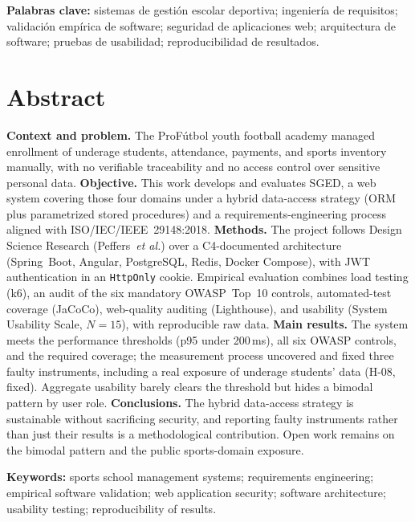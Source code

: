 \documentclass[11pt,a4paper]{article}
\begin{document}
\textbf{Palabras clave:} sistemas de gestión escolar deportiva;
ingeniería de requisitos; validación empírica de software; seguridad de
aplicaciones web; arquitectura de software; pruebas de usabilidad;
reproducibilidad de resultados.

\newpage

\section*{Abstract}
\label{sec:resumen-en}

\textbf{Context and problem.} The ProFútbol youth football academy
managed enrollment of underage students, attendance, payments, and
sports inventory manually, with no verifiable traceability and no
access control over sensitive personal data. \textbf{Objective.} This
work develops and evaluates SGED, a web system covering those four
domains under a hybrid data-access strategy (ORM plus parametrized
stored procedures) and a requirements-engineering process aligned with
ISO/IEC/IEEE~29148:2018. \textbf{Methods.} The project follows Design
Science Research (Peffers~\emph{et al.}) over a C4-documented
architecture (Spring~Boot, Angular, PostgreSQL, Redis, Docker
Compose), with JWT authentication in an \texttt{HttpOnly} cookie.
Empirical evaluation combines load testing (k6), an audit of the six
mandatory OWASP~Top~10 controls, automated-test coverage (JaCoCo),
web-quality auditing (Lighthouse), and usability (System Usability
Scale, $N=15$), with reproducible raw data. \textbf{Main results.} The
system meets the performance thresholds (p95 under 200\,ms), all six
OWASP controls, and the required coverage; the measurement process
uncovered and fixed three faulty instruments, including a real
exposure of underage students' data (H-08, fixed). Aggregate usability
barely clears the threshold but hides a bimodal pattern by user role.
\textbf{Conclusions.} The hybrid data-access strategy is sustainable
without sacrificing security, and reporting faulty instruments rather
than just their results is a methodological contribution. Open work
remains on the bimodal pattern and the public sports-domain exposure.

\textbf{Keywords:} sports school management systems; requirements
engineering; empirical software validation; web application security;
software architecture; usability testing; reproducibility of results.

\newpage

\end{document}
